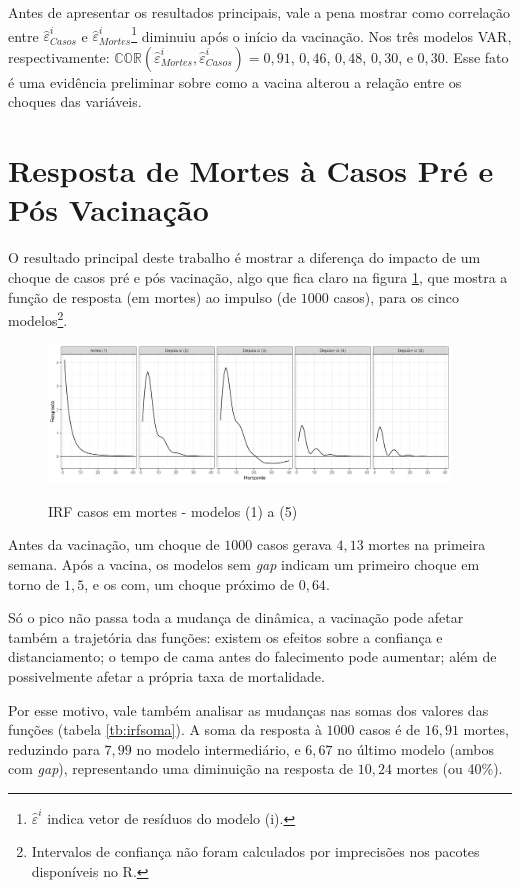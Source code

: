 \documentclass[
    article,
	12pt,				%
	oneside,			%
	a4paper,			%
	english,			%
	brazil,				%
	hyperref = {colorlinks, citecolor=c1d, linkcolor=c2d, urlcolor=c3d, colorlinks}
	]{abntex2}
\newcounter{j}
\begin{document}
Antes de apresentar os resultados principais, vale a pena mostrar como correlação entre $\hat{\varepsilon}^i_{Casos}$ e $\hat{\varepsilon}^i_{Mortes}$\footnote{$\hat{\varepsilon}^i$ indica vetor de resíduos do modelo (i).} diminuiu após o início da vacinação. Nos três modelos VAR, respectivamente: $\mathbb{COR}(\hat{\varepsilon}^i_{Mortes}, \hat{\varepsilon}^i_{Casos}) = 0,91$, $0,46$, $0,48$, $0,30$, e $0,30$. Esse fato é uma evidência preliminar sobre como a vacina alterou a relação entre os choques das variáveis.


\section{Resposta de Mortes à Casos Pré e Pós Vacinação}\label{sec:res1}

O resultado principal deste trabalho é mostrar a diferença do impacto de um choque de casos pré e pós vacinação, algo que fica claro na figura \ref{fig:IRF BaA}, que mostra a função de resposta (em mortes) ao impulso (de $1000$ casos), para os cinco modelos\footnote{Intervalos de confiança não foram calculados por imprecisões nos pacotes disponíveis no R.}.

\begin{figure}[H]
    \centering
    \caption{IRF casos em mortes - modelos (1) a (5)}
    \includegraphics[width = 0.95\textwidth]{Figuras/res1_irfs.png}
    \label{fig:IRF BaA}
\end{figure}

Antes da vacinação, um choque de $1000$ casos gerava $4,13$ mortes na primeira semana. Após a vacina, os modelos sem \textit{gap} indicam um primeiro choque em torno de $1,5$, e os com, um choque próximo de $0,64$.

Só o pico não passa toda a mudança de dinâmica, a vacinação pode afetar também a trajetória das funções: existem os efeitos sobre a confiança e distanciamento; o tempo de cama antes do falecimento pode aumentar; além de possivelmente afetar a própria taxa de mortalidade.

Por esse motivo, vale também analisar as mudanças nas somas dos valores das funções (tabela \ref{tb:irfsoma}). A soma da resposta à $1000$ casos é de $16,91$ mortes, reduzindo para $7,99$ no modelo intermediário, e $6,67$ no último modelo (ambos com \textit{gap}), representando uma diminuição na resposta de $10,24$ mortes (ou 40\%).
\end{document}
